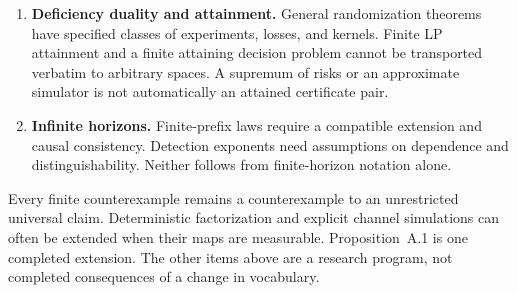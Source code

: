 \begin{enumerate}
\item \textbf{Deficiency duality and attainment.} General randomization theorems have specified classes of experiments, losses, and kernels. Finite LP attainment and a finite attaining decision problem cannot be transported verbatim to arbitrary spaces. A supremum of risks or an approximate simulator is not automatically an attained certificate pair.
\item \textbf{Infinite horizons.} Finite-prefix laws require a compatible extension and causal consistency. Detection exponents need assumptions on dependence and distinguishability. Neither follows from finite-horizon notation alone.
\end{enumerate}


Every finite counterexample remains a counterexample to an unrestricted universal claim. Deterministic factorization and explicit channel simulations can often be extended when their maps are measurable. Proposition~A.1 is one completed extension. The other items above are a research program, not completed consequences of a change in vocabulary.
